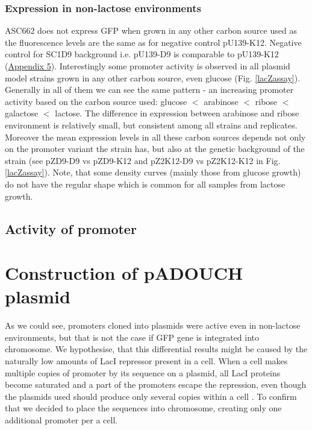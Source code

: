 \subsubsection{Expression in non-lactose environments}
ASC662 does not express GFP when grown in any other carbon source used as the fluorescence levels are the same as for negative control pU139-K12.
Negative control for SC1\textunderscore D9 background i.e. pU139-D9 is comparable to pU139-K12 (\hyperlink{FCnegs}{Appendix 5}).
Interestingly some  promoter activity is observed in all plasmid model strains grown in any other carbon source, even glucose (Fig. \ref{lacZassay}).
Generally in all of them we can see the same pattern - an increasing  promoter activity based on the carbon source used: glucose $<$ arabinose $<$ ribose $<$ galactose $<$ lactose.
The difference in expression between arabinose and ribose environment is relatively small, but consistent among all strains and replicates.
Moreover the mean expression levels in all these carbon sources depends not only on the promoter variant the strain has, but also at the genetic background of the strain (see pZ\textunderscore D9-D9 vs pZ\textunderscore D9-K12 and pZ2\textunderscore K12-D9 vs pZ2\textunderscore K12-K12 in Fig. \ref{lacZassay}).
Note, that some density curves (mainly those from glucose growth) do not have the regular shape which is common for all samples from lactose growth.

\subsection{Activity of  promoter}

\section{Construction of pADOUCH plasmid}
As we could see,  promoters cloned into plasmids were active even in non-lactose environments, but that is not the case if GFP gene is integrated into chromosome.
We hypothesise, that this differential results might be caused by the naturally low amounts of LacI repressor present in a cell.
When a cell makes multiple copies of  promoter by its sequence on a plasmid, all LacI proteins become saturated and a part of the promoters escape the repression, even though the plasmids used should produce only several copies within a cell \cite{zaslaver2006comprehensive}.
To confirm that we decided to place the  sequences into chromosome, creating only one additional  promoter per a cell.

